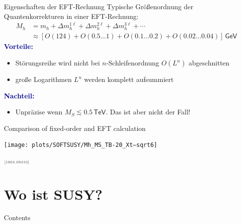 \documentclass[hyperref={pdfpagelabels=false},ngerman]{beamer}
\newcommand{\eh}[1]{\,\mathsf{#1}}
\newcommand{\MS}{\ensuremath{M_S}}
\newcommand{\mycite}[1]{\ensuremath{\text{\textcolor{darkgray}{\tiny [#1]}}}}
\renewcommand{\emph}[1]{\textbf{\textcolor{darkblue}{#1}}}
\newcommand{\TeV}{\eh{TeV}}
\begin{document}
\begin{frame}{Eigenschaften der EFT-Rechnung}
  Typische Größenordnung der Quantenkorrekturen in einer EFT-Rechnung:
  \begin{align*}
    M_h &= m_h + \Delta m_h^{1\ell} + \Delta m_h^{2\ell} + \Delta m_h^{3\ell} + \cdots \\
    &\approx [O(124) + O(0.5\ldots 1) + O(0.1\ldots 0.2) + O(0.02\ldots 0.04)] \eh{GeV}
  \end{align*}
  \emph{Vorteile:}
  \begin{itemize}
  \item Störungsreihe wird nicht bei $n$-Schleifenordnung $O(L^n)$
    abgeschnitten
  \item große Logarithmen $L^n$ werden komplett aufsummiert
  \end{itemize}
  \vspace*{1em}
  \emph{Nachteil:}
  \begin{itemize}
  \item Unpräzise wenn  $\MS \lesssim 0.5\TeV$.
    Das ist aber nicht der Fall!
  \end{itemize}
\end{frame}

\begin{frame}{Comparison of fixed-order and EFT calculation}
  \begin{center}
    \texttt{[image: plots/SOFTSUSY/Mh\_MS\_TB-20\_Xt--sqrt6]}
  \end{center}
  \raggedleft\mycite{1804.09410}
\end{frame}


\section{Wo ist SUSY?}

\begin{frame}{Contents}
  \tableofcontents[currentsection]  
\end{frame}

\end{document}
